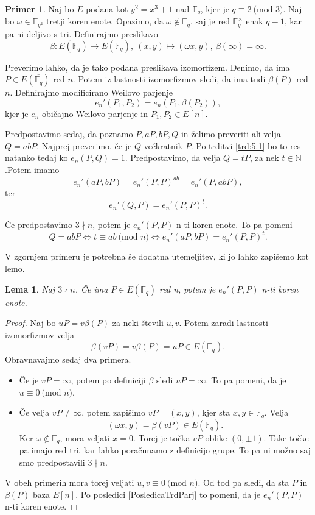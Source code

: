 \documentclass[12pt,a4paper,twoside]{article}
\theoremstyle{definition} %
\newtheorem{primer}[definicija]{Primer}
\theoremstyle{plain} %
\newtheorem{lema}[definicija]{Lema}
\numberwithin{equation}{section}  %
\newcommand{\N}{\mathbb N}
\newcommand{\F}{\mathbb F}
\newcommand{\E}[1]{E({#1})}
\newcommand{\MOD}[1]{\ \text{(mod }{#1}\text{)}}
\begin{document}
\begin{primer}

Naj bo $E$ podana kot $y^2=x^3+1$ nad $\F_q$, kjer je $q \equiv 2 \MOD{3}$. Naj bo $\omega \in \F_{q^2}$ tretji koren enote. Opazimo, da $\omega \notin \F_q$, saj je red $\F^{\times}_q$ enak $q-1$, kar pa ni deljivo s tri.
Definirajmo preslikavo
$$\beta:\E{\overline{\F_q}} \rightarrow \E{\overline{\F_q}}, \ (x,y) \mapsto (\omega x,y), \ \beta(\infty) = \infty.$$

Preverimo lahko, da je tako podana preslikava izomorfizem. Denimo, da ima $P \in \E{\overline{\F_q}}$ red $n$. Potem iz lastnosti izomorfizmov sledi, da ima tudi $\beta(P)$ red $n$.
Definirajmo modificirano Weilovo parjenje
$$e_n'(P_1,P_2) = e_n(P_1,\beta(P_2)),$$
kjer je $e_n$ običajno Weilovo parjenje in $P_1,P_2 \in E[n]$.

Predpostavimo sedaj, da poznamo $P,aP,bP,Q$ in želimo preveriti ali velja $Q=abP$. Najprej preverimo, če je $Q$ večkratnik $P$. Po trditvi \ref{trd:5.1} bo to res natanko tedaj ko $e_n(P,Q) = 1$.
Predpostavimo, da velja $Q = tP$, za nek $t \in \N$.Potem imamo
$$e_n'(aP,bP)=e_n'(P,P)^{ab} = e_n'(P,abP),$$
ter
$$e_n'(Q,P) = e_n'(P,P)^t.$$

Če predpostavimo $3 \nmid n$, potem je $e_n'(P,P)$ n-ti koren enote. To pa pomeni
$$Q=abP \iff t \equiv ab \MOD{n} \iff e_n'(aP,bP)=e_n'(P,P)^t.$$
\end{primer}

V zgornjem primeru je potrebna še dodatna utemeljitev, ki jo lahko zapišemo kot lemo.

\begin{lema}
Naj $3 \nmid n$. Če ima $P \in \E{\F_q}$ red n, potem je $e_n'(P,P)$ n-ti koren enote.
\end{lema}

\begin{proof}

Naj bo $uP = v\beta(P)$ za neki števili $u,v$. Potem zaradi lastnosti izomorfizmov velja
$$\beta(vP) = v\beta(P) = uP \in \E{\F_q}.$$
Obravnavajmo sedaj dva primera.
\begin{itemize}
\item Če je $vP = \infty$, potem po definiciji $\beta$ sledi $uP = \infty$. To pa pomeni, da je $u \equiv 0 \MOD{n}$.
\item Če velja $vP \neq \infty$, potem zapišimo $vP = (x,y)$, kjer sta $x,y \in \F_q$. Velja
$$(\omega x,y) = \beta(vP) \in \E{\F_q}.$$
Ker $\omega \notin \F_q$, mora veljati $x = 0$. Torej je točka $vP$ oblike $(0,\pm 1)$. Take točke pa imajo red tri, kar lahko poračunamo z definicijo grupe. To pa ni možno saj smo predpostavili $3 \nmid n$.
\end{itemize}

V obeh primerih mora torej veljati $u,v \equiv 0 \MOD{n}$. Od tod pa sledi, da sta $P$ in $\beta(P)$ baza $E[n]$. Po posledici \ref{PosledicaTrdParj} to pomeni, da je $e_n'(P,P)$ n-ti koren enote.

\end{proof}
\end{document}
